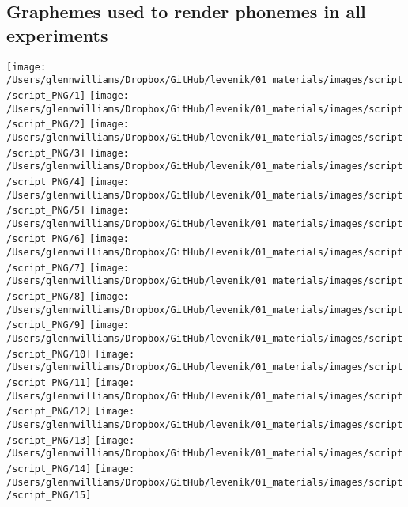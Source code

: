 \clearpage



\begin{appendix}
\section{}
\hypertarget{appendix-a}{%
\subsection{Graphemes used to render phonemes in all
experiments}\label{appendix-a}}

\begin{figure*}[htb]

{\centering \texttt{[image: /Users/glennwilliams/Dropbox/GitHub/levenik/01\_materials/images/script/script\_PNG/1]} \texttt{[image: /Users/glennwilliams/Dropbox/GitHub/levenik/01\_materials/images/script/script\_PNG/2]} \texttt{[image: /Users/glennwilliams/Dropbox/GitHub/levenik/01\_materials/images/script/script\_PNG/3]} \texttt{[image: /Users/glennwilliams/Dropbox/GitHub/levenik/01\_materials/images/script/script\_PNG/4]} \texttt{[image: /Users/glennwilliams/Dropbox/GitHub/levenik/01\_materials/images/script/script\_PNG/5]} \texttt{[image: /Users/glennwilliams/Dropbox/GitHub/levenik/01\_materials/images/script/script\_PNG/6]} \texttt{[image: /Users/glennwilliams/Dropbox/GitHub/levenik/01\_materials/images/script/script\_PNG/7]} \texttt{[image: /Users/glennwilliams/Dropbox/GitHub/levenik/01\_materials/images/script/script\_PNG/8]} \texttt{[image: /Users/glennwilliams/Dropbox/GitHub/levenik/01\_materials/images/script/script\_PNG/9]} \texttt{[image: /Users/glennwilliams/Dropbox/GitHub/levenik/01\_materials/images/script/script\_PNG/10]} \texttt{[image: /Users/glennwilliams/Dropbox/GitHub/levenik/01\_materials/images/script/script\_PNG/11]} \texttt{[image: /Users/glennwilliams/Dropbox/GitHub/levenik/01\_materials/images/script/script\_PNG/12]} \texttt{[image: /Users/glennwilliams/Dropbox/GitHub/levenik/01\_materials/images/script/script\_PNG/13]} \texttt{[image: /Users/glennwilliams/Dropbox/GitHub/levenik/01\_materials/images/script/script\_PNG/14]} \texttt{[image: /Users/glennwilliams/Dropbox/GitHub/levenik/01\_materials/images/script/script\_PNG/15]} 

}
\end{figure*}
\end{appendix}
